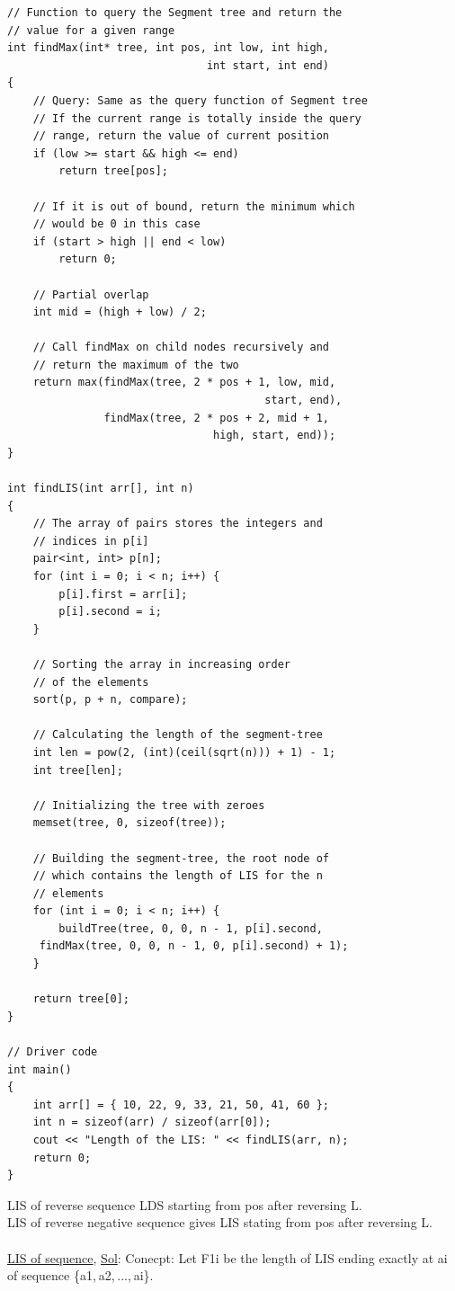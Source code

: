 \documentclass[8pt, a4paper, oneside, twocolumn]{extarticle}
\begin{document}
\begin{verbatim}
// Function to query the Segment tree and return the
// value for a given range
int findMax(int* tree, int pos, int low, int high, 
                               int start, int end)
{
    // Query: Same as the query function of Segment tree
    // If the current range is totally inside the query 
    // range, return the value of current position
    if (low >= start && high <= end) 
        return tree[pos];
     
    // If it is out of bound, return the minimum which
    // would be 0 in this case
    if (start > high || end < low) 
        return 0;    
 
    // Partial overlap
    int mid = (high + low) / 2;
 
    // Call findMax on child nodes recursively and 
    // return the maximum of the two
    return max(findMax(tree, 2 * pos + 1, low, mid, 
                                        start, end), 
               findMax(tree, 2 * pos + 2, mid + 1, 
                                high, start, end));
}
 
int findLIS(int arr[], int n)
{
    // The array of pairs stores the integers and 
    // indices in p[i]
    pair<int, int> p[n];
    for (int i = 0; i < n; i++) {
        p[i].first = arr[i]; 
        p[i].second = i; 
    }
 
    // Sorting the array in increasing order
    // of the elements
    sort(p, p + n, compare);
 
    // Calculating the length of the segment-tree
    int len = pow(2, (int)(ceil(sqrt(n))) + 1) - 1;
    int tree[len];
 
    // Initializing the tree with zeroes
    memset(tree, 0, sizeof(tree)); 
 
    // Building the segment-tree, the root node of 
    // which contains the length of LIS for the n
    // elements
    for (int i = 0; i < n; i++) {
        buildTree(tree, 0, 0, n - 1, p[i].second, 
     findMax(tree, 0, 0, n - 1, 0, p[i].second) + 1);
    }
     
    return tree[0];
}
 
// Driver code
int main()
{
    int arr[] = { 10, 22, 9, 33, 21, 50, 41, 60 };
    int n = sizeof(arr) / sizeof(arr[0]);
    cout << "Length of the LIS: " << findLIS(arr, n);
    return 0;
}
\end{verbatim}
LIS of reverse sequence LDS starting from pos after reversing L.\\
LIS of reverse negative sequence gives LIS stating from pos after reversing L.\\
\\\href{https://codeforces.com/problemset/problem/486/E}{LIS of sequence}, \href{https://github.com/sourabh2311/Competitive-Programming/blob/master/Reference%20Notes/LIS%20Using%20Segment%20Trees/Problem/sol2_ifsmirnov.cpp}{Sol}: Conecpt:
Let F1i be the length of LIS ending exactly at ai of sequence \{a1, a2, ..., ai\}.
\end{document}
